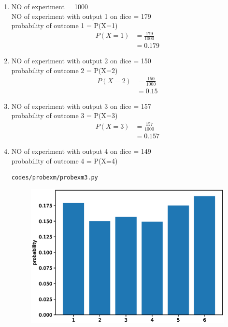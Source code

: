 \renewcommand{\theequation}{\theenumi}
\begin{enumerate}[label=\arabic*.,ref=\thesubsection.\theenumi]
\item NO of experiment = 1000
\\
NO of experiment with output 1 on dice = 179
\\
probability of outcome 1 = P(X=1)
\begin{align}
P\left(X=1\right) &= \frac{179}{1000}
\\
&= 0.179
\end{align}
\item
NO of experiment with output 2 on dice = 150
\\
probability of outcome 2 = P(X=2)
\begin{align}
P\left(X=2\right) &= \frac{150}{1000}
\\
&= 0.15
\end{align}
\item
NO of experiment with output 3 on dice = 157
\\
probability of outcome 3 = P(X=3)
\begin{align}
P\left(X=3\right) &= \frac{157}{1000}
\\
&= 0.157
\end{align}
\item
NO of experiment with output 4 on dice = 149
\\
probability of outcome 4 = P(X=4)
\begin{lstlisting}
codes/probexm/probexm3.py
\end{lstlisting}
\begin{figure}[!ht]
	\centering
	\includegraphics[width=\columnwidth]{./figures/probexm/probexm3.eps}

\end{figure}
\end{enumerate}
